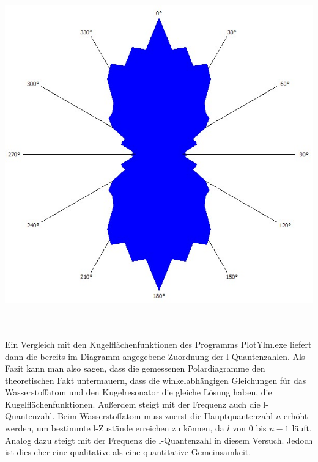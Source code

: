 \documentclass[german,  %
parskip=full,  %
]{scrartcl}
\begin{document}
\\\\
\begin{minipage}{0.48 \textwidth} \centering
\includegraphics[scale=0.3]{432_Peak_5.jpg}
\end{minipage}
\\\\
Ein Vergleich mit den Kugelflächenfunktionen des Programms PlotYlm.exe liefert dann die bereits im Diagramm angegebene Zuordnung der l-Quantenzahlen.
\newline Als Fazit kann man also sagen, dass die gemessenen Polardiagramme den theoretischen Fakt untermauern, dass die winkelabhängigen Gleichungen für das Wasserstoffatom und den Kugelresonator die gleiche Lösung haben, die Kugelflächenfunktionen. Außerdem steigt mit der Frequenz auch die l-Quantenzahl. Beim Wasserstoffatom muss zuerst die Hauptquantenzahl $n$ erhöht werden, um bestimmte l-Zustände erreichen zu können, da $l$ von $0$ bis $n-1$ läuft. Analog dazu steigt mit der Frequenz die l-Quantenzahl in diesem Versuch. Jedoch ist dies eher eine qualitative als eine quantitative Gemeinsamkeit.
\end{document}
